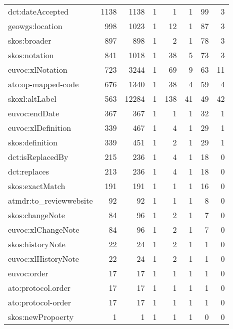 \documentclass[10pt,a4paper,titlepage,final]{article}
\begin{document}
\begin{longtable}{lrrrrrrr}
       dct:dateAccepted &        1138 &     1138 &    1 &    1 &    1 &          99 &        3 \\
        geowgs:location &         998 &     1023 &    1 &   12 &    1 &          87 &        3 \\
           skos:broader &         897 &      898 &    1 &    2 &    1 &          78 &        3 \\
          skos:notation &         841 &     1018 &    1 &   38 &    5 &          73 &        3 \\
       euvoc:xlNotation &         723 &     3244 &    1 &   69 &    9 &          63 &       11 \\
     ato:op-mapped-code &         676 &     1340 &    1 &   38 &    4 &          59 &        4 \\
         skoxl:altLabel &         563 &    12284 &    1 &  138 &   41 &          49 &       42 \\
          euvoc:endDate &         367 &      367 &    1 &    1 &    1 &          32 &        1 \\
     euvoc:xlDefinition &         339 &      467 &    1 &    4 &    1 &          29 &        1 \\
        skos:definition &         339 &      451 &    1 &    2 &    1 &          29 &        1 \\
       dct:isReplacedBy &         215 &      236 &    1 &    4 &    1 &          18 &        0 \\
           dct:replaces &         213 &      236 &    1 &    4 &    1 &          18 &        0 \\
        skos:exactMatch &         191 &      191 &    1 &    1 &    1 &          16 &        0 \\
 atmdr:to\_reviewwebsite &          92 &       92 &    1 &    1 &    1 &           8 &        0 \\
        skos:changeNote &          84 &       96 &    1 &    2 &    1 &           7 &        0 \\
     euvoc:xlChangeNote &          84 &       96 &    1 &    2 &    1 &           7 &        0 \\
       skos:historyNote &          22 &       24 &    1 &    2 &    1 &           1 &        0 \\
    euvoc:xlHistoryNote &          22 &       24 &    1 &    2 &    1 &           1 &        0 \\
            euvoc:order &          17 &       17 &    1 &    1 &    1 &           1 &        0 \\
     ato:protocol.order &          17 &       17 &    1 &    1 &    1 &           1 &        0 \\
     ato:protocol-order &          17 &       17 &    1 &    1 &    1 &           1 &        0 \\
      skos:newPropoerty &           1 &        1 &    1 &    1 &    1 &           0 &        0 \\
\end{longtable}
\end{document}

